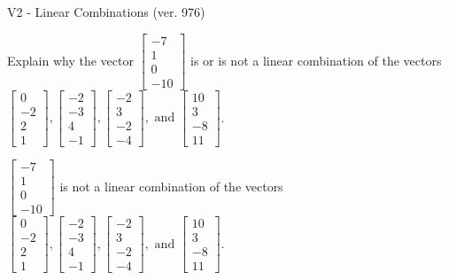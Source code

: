 \begin{exercise}
  \begin{exerciseTitle}V2 - Linear Combinations (ver. 976)\end{exerciseTitle}
  \begin{exerciseStatement}
    Explain why the vector \(\left[\begin{array}{c}
-7 \\
1 \\
0 \\
-10
\end{array}\right]\)  is or is not a linear 
	combination of the vectors \(\left[\begin{array}{c}
0 \\
-2 \\
2 \\
1
\end{array}\right] , \left[\begin{array}{c}
-2 \\
-3 \\
4 \\
-1
\end{array}\right] , \left[\begin{array}{c}
-2 \\
3 \\
-2 \\
-4
\end{array}\right] , \text{ and } \left[\begin{array}{c}
10 \\
3 \\
-8 \\
11
\end{array}\right]\).
	


  \end{exerciseStatement}
  \begin{exerciseAnswer}
   \(\left[\begin{array}{c}
-7 \\
1 \\
0 \\
-10
\end{array}\right]\) 
  	 is not  
	a linear combination of the vectors \(\left[\begin{array}{c}
0 \\
-2 \\
2 \\
1
\end{array}\right] , \left[\begin{array}{c}
-2 \\
-3 \\
4 \\
-1
\end{array}\right] , \left[\begin{array}{c}
-2 \\
3 \\
-2 \\
-4
\end{array}\right] , \text{ and } \left[\begin{array}{c}
10 \\
3 \\
-8 \\
11
\end{array}\right]\).


\end{exerciseAnswer}
\end{exercise}
